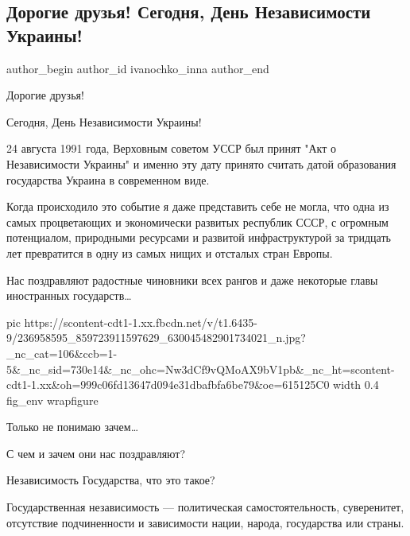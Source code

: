  
 
 
 
 
 
\subsection{Дорогие друзья! Сегодня, День Независимости Украины!}
\label{sec:24_08_2021.fb.ivanochko_inna.1.nezavisimost}
 
\ifcmt
 author_begin
   author_id ivanochko_inna
 author_end
\fi

Дорогие друзья! 

Сегодня, День Независимости Украины!

24 августа 1991 года, Верховным советом УССР был принят "Акт о Независимости
Украины" и именно эту дату принято считать датой образования государства
Украина в современном виде. 

Когда происходило это событие я даже представить себе не могла, что одна из
самых процветающих и экономически развитых республик СССР, с огромным
потенциалом, природными ресурсами и развитой инфраструктурой  за тридцать лет
превратится в одну из самых нищих и отсталых стран Европы. 

Нас поздравляют радостные  чиновники всех рангов и даже некоторые главы
иностранных государств… 

\ifcmt
  pic https://scontent-cdt1-1.xx.fbcdn.net/v/t1.6435-9/236958595_859723911597629_630045482901734021_n.jpg?_nc_cat=106&ccb=1-5&_nc_sid=730e14&_nc_ohc=Nw3dCf9vQMoAX9bV1pb&_nc_ht=scontent-cdt1-1.xx&oh=999c06fd13647d094e31dbafbfa6be79&oe=615125C0
  width 0.4
	fig_env wrapfigure
\fi

Только не понимаю зачем… 

С чем и зачем они нас поздравляют? 

Независимость Государства, что это такое? 

Государственная независимость — политическая самостоятельность, суверенитет,
отсутствие подчиненности и зависимости нации, народа, государства или страны.

